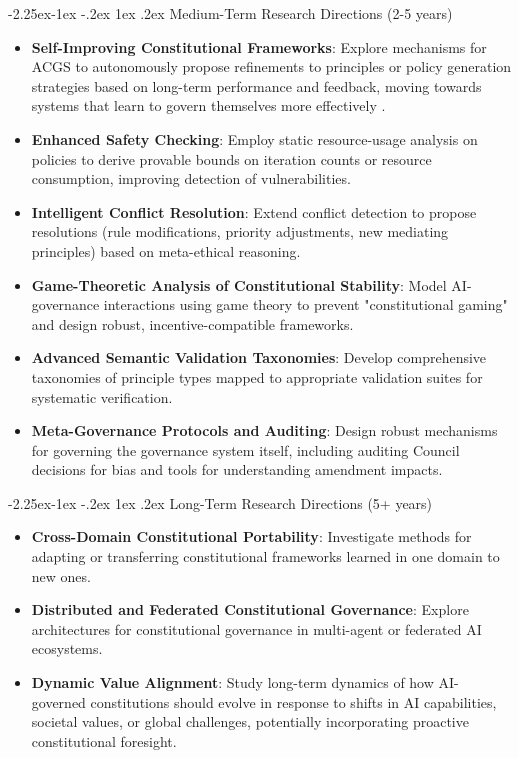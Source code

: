 \documentclass[manuscript,screen,9pt]{acmart}
\makeatletter
\renewcommand\subsection{\@startsection{subsection}{2}{\z@}%
  {-2.25ex\@plus -1ex \@minus -.2ex}%
  {1ex \@plus .2ex}%
  {\normalfont\large\bfseries}}
\makeatother
\begin{document}
\subsection{Medium-Term Research Directions (2-5 years)}
\label{subsec:medium_term_research}
\begin{itemize}[leftmargin=*,itemsep=1pt,parsep=1pt]
    \item \textbf{Self-Improving Constitutional Frameworks}: Explore mechanisms for ACGS to autonomously propose refinements to principles or policy generation strategies based on long-term performance and feedback, moving towards systems that learn to govern themselves more effectively \cite{Zhao2025AbsoluteZero}.
    \item \textbf{Enhanced Safety Checking}: Employ static resource-usage analysis on policies to derive provable bounds on iteration counts or resource consumption, improving detection of vulnerabilities.
    \item \textbf{Intelligent Conflict Resolution}: Extend conflict detection to propose resolutions (rule modifications, priority adjustments, new mediating principles) based on meta-ethical reasoning.
    \item \textbf{Game-Theoretic Analysis of Constitutional Stability}: Model AI-governance interactions using game theory to prevent "constitutional gaming" and design robust, incentive-compatible frameworks.
    \item \textbf{Advanced Semantic Validation Taxonomies}: Develop comprehensive taxonomies of principle types mapped to appropriate validation suites for systematic verification.
    \item \textbf{Meta-Governance Protocols and Auditing}: Design robust mechanisms for governing the governance system itself, including auditing Council decisions for bias and tools for understanding amendment impacts.
\end{itemize}

\subsection{Long-Term Research Directions (5+ years)}
\label{subsec:long_term_research}
\begin{itemize}[leftmargin=*,itemsep=1pt,parsep=1pt]
    \item \textbf{Cross-Domain Constitutional Portability}: Investigate methods for adapting or transferring constitutional frameworks learned in one domain to new ones.
    \item \textbf{Distributed and Federated Constitutional Governance}: Explore architectures for constitutional governance in multi-agent or federated AI ecosystems.
    \item \textbf{Dynamic Value Alignment}: Study long-term dynamics of how AI-governed constitutions should evolve in response to shifts in AI capabilities, societal values, or global challenges, potentially incorporating proactive constitutional foresight.
\end{itemize}
\end{document}
